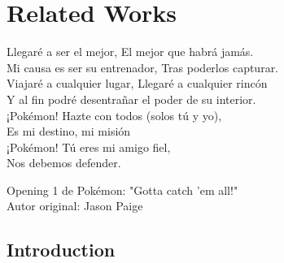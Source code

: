 % 
% 
% 
% 
% 
% 
% 

\chapter{Related Works}
\label{cha:related_works}

\begin{FraseCelebre}
\begin{Frase}
	Llegaré a ser el mejor, El mejor que habrá jamás. \\
	Mi causa es ser su entrenador, Tras poderlos capturar. \\
	
	Viajaré a cualquier lugar, Llegaré a cualquier rincón \\  
	Y al fin podré desentrañar el poder de su interior. \\ 
	
	¡Pokémon! Hazte con todos (solos tú y yo), \\
	Es mi destino, mi misión \\
	¡Pokémon! Tú eres mi amigo fiel, \\
	Nos debemos defender.
\end{Frase}
\begin{Fuente}
	Opening 1 de Pokémon: "Gotta catch 'em all!" \\
	Autor original: Jason Paige
\end{Fuente}
\end{FraseCelebre}

\section{Introduction}
\label{sec:2_introduction}

